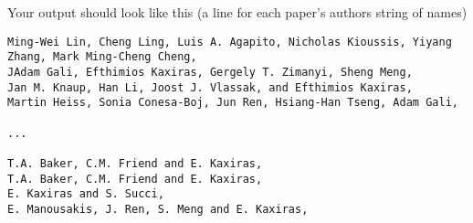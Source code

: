 \documentclass[11pt]{article}
\begin{document}
\begin{Verbatim}[commandchars=\\\{\}]
    \end{Verbatim}

    Your output should look like this (a line for each paper's authors
string of names)

\begin{verbatim}
Ming-Wei Lin, Cheng Ling, Luis A. Agapito, Nicholas Kioussis, Yiyang Zhang, Mark Ming-Cheng Cheng,
JAdam Gali, Efthimios Kaxiras, Gergely T. Zimanyi, Sheng Meng,
Jan M. Knaup, Han Li, Joost J. Vlassak, and Efthimios Kaxiras,
Martin Heiss, Sonia Conesa-Boj, Jun Ren, Hsiang-Han Tseng, Adam Gali,

...

T.A. Baker, C.M. Friend and E. Kaxiras,
T.A. Baker, C.M. Friend and E. Kaxiras,
E. Kaxiras and S. Succi,
E. Manousakis, J. Ren, S. Meng and E. Kaxiras,
\end{verbatim}


    
    
    
    
\end{document}
